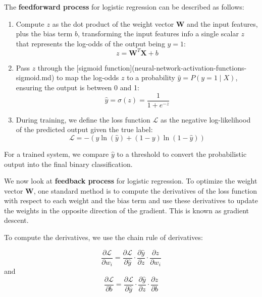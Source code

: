 \documentclass[conference]{IEEEtran}
\begin{document}
			
	The \textbf{feedforward process} for logistic regression can be described as follows:
	
	\begin{enumerate}[]
		\item Compute $z$ as the dot product of the weight vector $\textbf{W}$ and the input features, plus the bias term $b$, transforming the input features info a single scalar $z$ that represents the log-odds of the output being $y=1$: 
		\begin{equation}
			z= \textbf{W}^{T}\textbf{X} + b
		\end{equation}
		
		\item Pass $z$ through the [sigmoid function](neural-network-activation-functions-sigmoid.md)  to map the log-odds $z$ to a probability $\hat{y} = P(y = 1 \mid X)$, ensuring the output is between 0 and 1: 
		\begin{equation}
			\hat{y} = \sigma(z) = \frac{1}{1 + e^{-z}}
		\end{equation}

		\item During training, we define the loss function $\mathcal{L}$ as the negative log-likelihood of the predicted output given the true label: 
		\begin{equation}
			\mathcal{L} = -\left(y\ln(\hat{y}) + (1-y)\ln(1-\hat{y})\right)
		\end{equation}
	\end{enumerate}
	
	For a trained system, we compare $\hat{y}$ to a threshold to convert the probabilistic output into the final binary classification.
	
	\bigskip
	
	We now look at \textbf{feedback process} for logistic regression. To optimize the weight vector $\textbf{W}$, one standard method is to compute the derivatives of the loss function with respect to each weight and the bias term and use these derivatives to update the weights in the opposite direction of the gradient. This is known as gradient descent.
	
	To compute the derivatives, we use the chain rule of derivatives:
	
	$$
	\frac{\partial\mathcal{L}}{\partial w_i} =
	\frac{\partial\mathcal{L}}{\partial \hat{y}} \cdot
	\frac{\partial \hat{y}}{\partial z} \cdot
	\frac{\partial z}{\partial w_i}
	$$ and
	$$
	\frac{\partial\mathcal{L}}{\partial b} =
	\frac{\partial\mathcal{L}}{\partial \hat{y}} \cdot
	\frac{\partial \hat{y}}{\partial z} \cdot
	\frac{\partial z}{\partial b}
	$$
	
\end{document}
